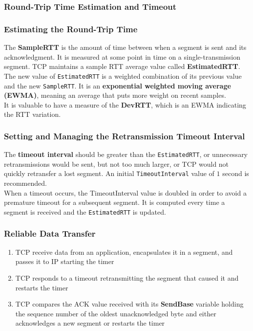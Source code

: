 \documentclass{article}
\begin{document}
\subsubsection{Round-Trip Time Estimation and Timeout}
\subsubsection*{Estimating the Round-Trip Time}
The \textbf{SampleRTT} is the amount of time between when a segment is sent and its acknowledgment. It is measured at some point in time on a single-transmission segment.
TCP maintains a sample RTT average value called \textbf{EstimatedRTT}. \\ The new value of \verb|EstimatedRTT| is a weighted combination of its previous value and the new \verb|SampleRTT|.
It is an \textbf{exponential weighted moving average (EWMA)}, meaning an average that puts more weight on recent samples. \\
It is valuable to have a measure of the \textbf{DevRTT}, which is an EWMA indicating the RTT variation.
\subsubsection*{Setting and Managing the Retransmission Timeout Interval}
The \textbf{timeout interval} should be greater than the \verb|EstimatedRTT|, or unnecessary retransmissions would be sent, but not too much larger, or TCP would not quickly retransfer a lost segment. An initial \verb|TimeoutInterval| value of $1$ second is recommended. \\ When a timeout occurs, the TimeoutInterval value is doubled in order to avoid a premature timeout for a subsequent segment.
It is computed every time a segment is received and the \verb|EstimatedRTT| is updated.
\subsubsection{Reliable Data Transfer}
\begin{enumerate}
    \item TCP receive data from an application, encapsulates it in a segment, and passes it to IP starting the timer
    \item TCP responds to a timeout retransmitting the segment that caused it and restarts the timer
    \item TCP compares the ACK value received with its \textbf{SendBase} variable holding the sequence number of the oldest unacknowledged byte and either acknowledges a new segment or restarts the timer
\end{enumerate}
\end{document}

